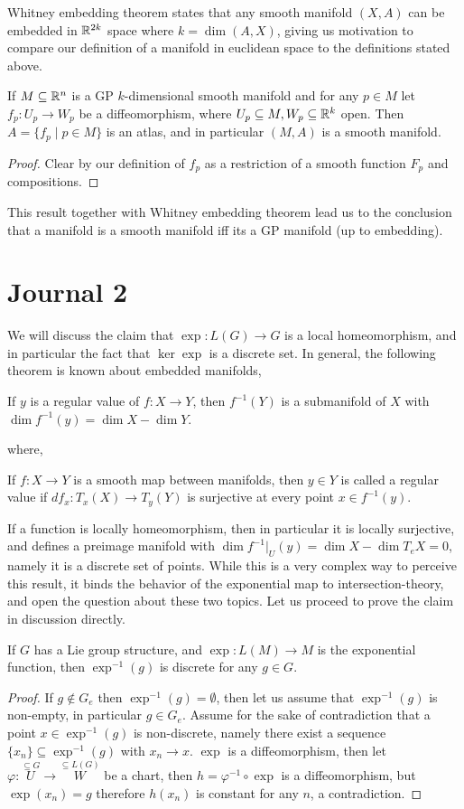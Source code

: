 Whitney embedding theorem states that any smooth manifold $(X, A)$ can be embedded in $\mathbb{R}^{2 k}$ space where $k = \dim (A, X)$,
giving us motivation to compare our definition of a manifold in euclidean space to the definitions stated above.
\begin{proposition}
	If $M \subseteq \mathbb{R}^n$ is a GP $k$-dimensional smooth manifold and for any $p \in M$ let $f_p : U_p \to W_p$ be a diffeomorphism, where $U_p \subseteq M, W_p \subseteq \mathbb{R}^k$ open.
	Then $A = \{ f_p \mid p \in M \}$ is an atlas, and in particular $(M, A)$ is a smooth manifold.
\end{proposition}
\begin{proof}
	Clear by our definition of $f_p$ as a restriction of a smooth function $F_p$ and compositions.
\end{proof}
This result together with Whitney embedding theorem lead us to the conclusion that a manifold is a smooth manifold iff its a GP manifold (up to embedding).

\section{Journal 2}
We will discuss the claim that $\exp : L(G) \to G$ is a local homeomorphism, and in particular the fact that $\ker \exp$ is a discrete set.
In general, the following theorem is known about embedded manifolds,
\begin{theorem}
	If $y$ is a regular value of $f : X \to Y$, then $f^{-1}(Y)$ is a submanifold of $X$ with $\dim f^{-1}(y) = \dim X - \dim Y$.
\end{theorem}
where,
\begin{definition}
	If $f : X \to Y$ is a smooth map between manifolds, then $y \in Y$ is called a regular value if $d f_x : T_x(X) \to T_y(Y)$ is surjective at every point $x \in f^{-1}(y)$.
\end{definition}
If a function is locally homeomorphism, then in particular it is locally surjective, and defines a preimage manifold with $\dim f^{-1}|_U(y) = \dim X - \dim T_e X = 0$, namely it is a discrete set of points.
While this is a very complex way to perceive this result, it binds the behavior of the exponential map to intersection-theory, and open the question about these two topics.
Let us proceed to prove the claim in discussion directly.
\begin{proposition}
	If $G$ has a Lie group structure, and $\exp : L(M) \to M$ is the exponential function, then $\exp^{-1}(g)$ is discrete for any $g \in G$.
\end{proposition}
\begin{proof}
	If $g \notin G_e$ then $\exp^{-1}(g) = \emptyset$, then let us assume that $\exp^{-1}(g)$ is non-empty, in particular $g \in G_e$.
	Assume for the sake of contradiction that a point $x \in \exp^{-1}(g)$ is non-discrete, namely there exist a sequence $\{ x_n \} \subseteq \exp^{-1}(g)$ with $x_n \to x$.
	$\exp$ is a diffeomorphism, then let $\varphi : \overset{\subseteq G}{U} \to \overset{\subseteq L(G)}{W}$ be a chart, then $h = \varphi^{-1} \circ \exp$ is a diffeomorphism,
	but $\exp(x_n) = g$ therefore $h(x_n)$ is constant for any $n$, a contradiction.
\end{proof}

